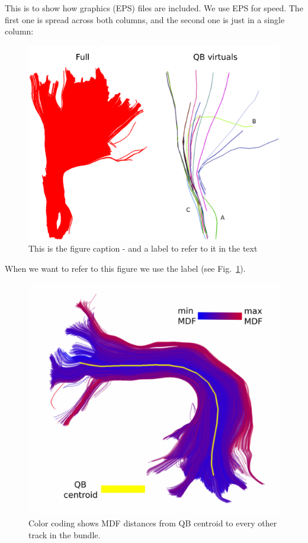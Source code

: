 \documentclass{bioinfo}
\begin{document}
This is to show how graphics (EPS) files are included. We use EPS for
speed. The first one is spread across both columns, and the second one
is just in a single column:

\begin{figure}
\centerline{\includegraphics[width=160mm]{Figures/Fig_4_cst_simplification_relabeled_triple.eps}}
\caption{This is the figure caption - and a label to refer to it in the text \label{Fig:big_picture}}
\end{figure}

When we want to refer to this figure we use the label (see Fig.~\ref{Fig:big_picture}).

\begin{figure}
\includegraphics[scale=0.15]{Figures/Fig_11_MDF_arcuate}
\centering{}
\caption{Color coding shows MDF distances from QB centroid to every
  other track in the bundle.\label{Fig:little_picture}}
\end{figure}
\end{document}
